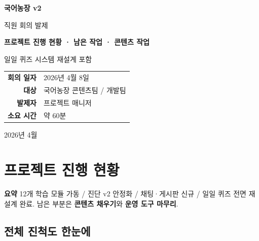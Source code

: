 \documentclass[11pt,a4paper]{article}
\newcommand{\summarybox}[1]{%
  \vspace{0.2cm}
  \noindent\colorbox{lightbg}{\parbox{\dimexpr\textwidth-2\fboxsep}{%
    \textbf{\color{korfarm}요약} \quad #1%
  }}
  \vspace{0.2cm}
}
\begin{document}
\begin{titlepage}
\centering
\vspace*{2.5cm}
{\Huge\bfseries\color{korfarm} 국어농장 v2 \par}
\vspace{0.3cm}
{\LARGE 직원 회의 발제\par}
\vspace{1.5cm}
{\huge\bfseries 프로젝트 진행 현황 · 남은 작업 · 콘텐츠 작업\par}
\vspace{0.6cm}
{\Large 일일 퀴즈 시스템 재설계 포함\par}
\vspace{2.5cm}

\begin{tabular}{rl}
\textbf{회의 일자} & 2026년 4월 8일 \\
\textbf{대상} & 국어농장 콘텐츠팀 / 개발팀 \\
\textbf{발제자} & 프로젝트 매니저 \\
\textbf{소요 시간} & 약 60분 \\
\end{tabular}

\vfill
{\large 2026년 4월\par}
\end{titlepage}

\tableofcontents
\newpage

\section{프로젝트 진행 현황}

\summarybox{12개 학습 모듈 가동 / 진단 v2 안정화 / 채팅·게시판 신규 / 일일 퀴즈 전면 재설계 완료. 남은 부분은 \textbf{콘텐츠 채우기}와 \textbf{운영 도구 마무리}.}

\subsection{전체 진척도 한눈에}
\end{document}
